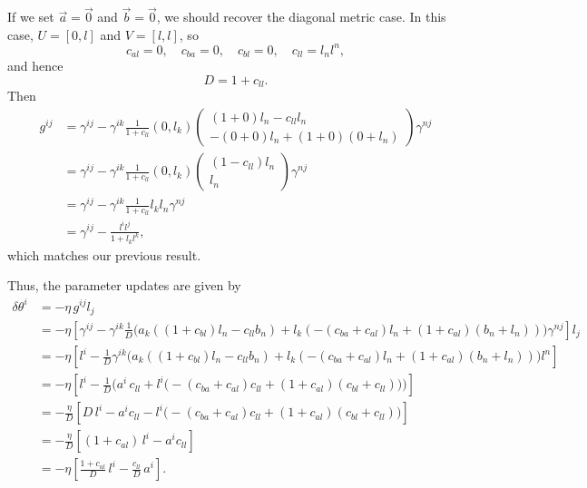 \documentclass{article}
\begin{document}
\begin{tcolorbox}[colback=gray!8, colframe=gray!22, breakable, title=\textbf{Quick Sanity Check}, coltitle=black]
    If we set $\vec{a}=\vec{0}$ and $\vec{b}=\vec{0}$, we should recover the diagonal metric case.
    In this case, $U=[0,l]$ and $V=[l,l]$, so $$
    c_{al} = 0,\quad c_{ba} = 0,\quad c_{bl} = 0,\quad c_{ll} = l_n l^n,
    $$ and hence $$
    D = 1 + c_{ll}.
    $$
    Then
    \begin{align*}
        g^{ij}
        &= \gamma^{ij} - \gamma^{ik} \frac{1}{1+c_{ll}} (0, l_k) \begin{pmatrix}
                (1 + 0) l_n - c_{ll} l_n \\
                -(0 + 0) l_n + (1 + 0) (0 + l_n)
           \end{pmatrix} \gamma^{nj} \\
        &= \gamma^{ij} - \gamma^{ik} \frac{1}{1+c_{ll}} (0, l_k) \begin{pmatrix}
                (1 - c_{ll}) l_n \\
                l_n
           \end{pmatrix} \gamma^{nj} \\
        &= \gamma^{ij} - \gamma^{ik} \frac{1}{1+c_{ll}} l_k l_n \gamma^{nj} \\
        &= \gamma^{ij} - \frac{l^i l^j}{1 + l_k l^k},
    \end{align*}
    which matches our previous result.
\end{tcolorbox}
\noindent Thus, the parameter updates are given by
\begin{align*}
    \delta\theta^i
    &= -\eta\, g^{ij} l_j \\
    &= -\eta\left[ \gamma^{ij} - \gamma^{ik}\frac{1}{D}\Big( 
            a_k\!\left((1+c_{bl})l_n - c_{ll} b_n\right)
            + l_k\!\left(-(c_{ba}+c_{al})l_n + (1+c_{al})(b_n + l_n)\right)
        \Big)\gamma^{nj} \right] l_j \\
    &= -\eta\left[ l^i - \frac{1}{D}\gamma^{ik}\Big(
            a_k\!\left((1+c_{bl})l_n - c_{ll}b_n\right)
            + l_k\!\left(-(c_{ba}+c_{al})l_n + (1+c_{al})(b_n+l_n)\right)
        \Big)l^n \right] \\
    &= -\eta\left[ l^i - \frac{1}{D}\Big(
            a^i\,c_{ll}
            + l^i\big(-(c_{ba}+c_{al})c_{ll} + (1+c_{al})(c_{bl}+c_{ll})\big)
        \Big) \right] \\
    &= -\frac{\eta}{D}\left[ D\,l^i - a^i c_{ll} - l^i\big(-(c_{ba}+c_{al})c_{ll} + (1+c_{al})(c_{bl}+c_{ll})\big) \right] \\
    &= -\frac{\eta}{D}\left[ (1 + c_{al})\,l^i - a^i c_{ll} \right] \\
    &= -\eta\left[ \frac{1 + c_{al}}{D}\,l^i - \frac{c_{ll}}{D}\,a^i \right].
\end{align*}
\end{document}
